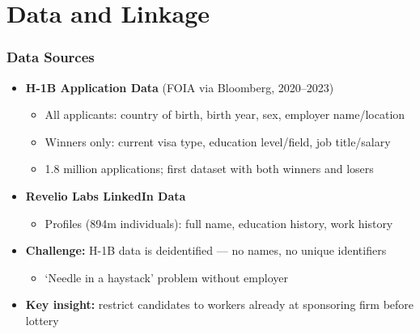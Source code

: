 \documentclass[xcolor=dvipsnames, compress, 12pt, aspectratio=169, presentation]{beamer}
\begin{document}
\section{Data and Linkage}
\begin{frame}
    \frametitle{Data Sources}
    \begin{itemize}
        \item \textbf{H-1B Application Data} (FOIA via Bloomberg, 2020--2023)
        \begin{itemize}
            \item All applicants: country of birth, birth year, sex, employer name/location
            \item Winners only: current visa type, education level/field, job title/salary
            \item 1.8 million applications; first dataset with both winners and losers
        \end{itemize}
        \vspace{4mm}
        \item \textbf{Revelio Labs LinkedIn Data}
        \begin{itemize}
            \item Profiles (894m individuals): full name, education history, work history
        \end{itemize}
        \vspace{4mm}
        \item \textbf{Challenge:} H-1B data is deidentified --- no names, no unique identifiers
        \begin{itemize}
            \item `Needle in a haystack' problem without employer
        \end{itemize}
        \vspace{4mm}
    \item \textbf{Key insight:} restrict candidates to workers already at sponsoring firm before lottery
    \end{itemize}
\end{frame}
\end{document}
